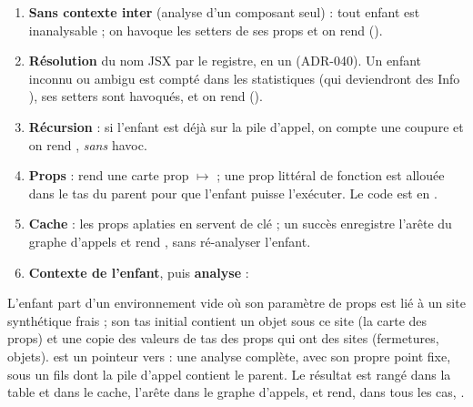 \begin{enumerate}
  \item \textbf{Sans contexte inter} (analyse d'un composant seul) : tout
    enfant est inanalysable ; on havoque les setters de ses props et on rend
     ().
  \item \textbf{Résolution} du nom JSX par le registre, en un
     (ADR-040). Un enfant inconnu ou ambigu est compté dans
    les statistiques (qui deviendront des Info ), ses
    setters sont havoqués, et on rend 
    ().
  \item \textbf{Récursion} : si l'enfant est déjà sur la pile d'appel, on
    compte une coupure et on rend , \emph{sans} havoc.
  \item \textbf{Props} :  rend une carte
    prop $\mapsto$  ; une prop littéral de fonction est allouée
    dans le tas du parent pour que l'enfant puisse l'exécuter. Le code est
    en .
  \item \textbf{Cache} : les props aplaties en  servent de
    clé ; un succès enregistre l'arête du graphe d'appels et rend
    , sans ré-analyser l'enfant.
  \item \textbf{Contexte de l'enfant}, puis \textbf{analyse} :
\end{enumerate}


L'enfant part d'un environnement vide où son paramètre de props est lié à
un site synthétique frais ; son tas initial contient un objet sous ce site
(la carte des props) et une copie des valeurs de tas des props qui ont des
sites (fermetures, objets).  est un pointeur vers
 : une analyse complète, avec son propre
point fixe, sous un  fils dont la pile d'appel contient le
parent. Le résultat est rangé dans la table  et dans le
cache, l'arête dans le graphe d'appels, et  rend, dans
tous les cas, .

